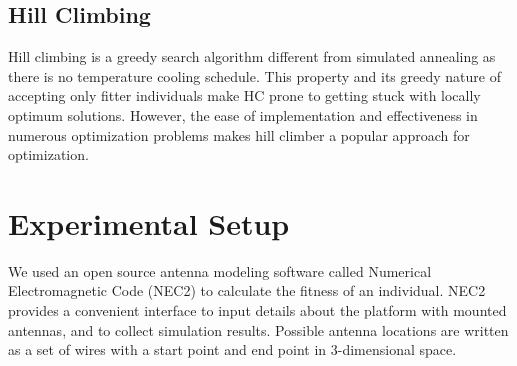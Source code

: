 \documentclass[conference]{IEEEtran}
\begin{document}
\subsection{Hill Climbing}
\label{sec:algoriths-hc}
Hill climbing is a greedy search algorithm different from simulated annealing as there is no temperature cooling schedule. This property and its greedy nature of accepting only fitter individuals make HC prone to getting stuck with locally optimum solutions. However, the ease of implementation and effectiveness in numerous optimization problems \cite{skalak1994} makes hill climber a popular approach for optimization.

\section{Experimental Setup}
\label{sec:setup}
We used an open source antenna modeling software called Numerical Electromagnetic Code (NEC2) to calculate the fitness of an individual. NEC2 provides a convenient interface to input details about the platform with mounted antennas, and to collect simulation results. Possible antenna locations are written as a set of wires with a start point and end point in 3-dimensional space.
\end{document}
